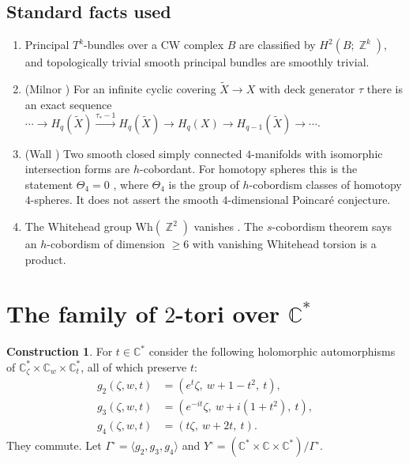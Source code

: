 \documentclass{article}
\DeclareMathOperator{\Z}{\mathbb{Z}}
\theoremstyle{definition}
\newtheorem{construction}[theorem]{Construction}
\theoremstyle{plain}
\newcommand{\C}{\mathbb{C}}
\newcommand{\Yo}{Y^{\circ}}
\begin{document}
\subsection{Standard facts used}\label{sec:facts}
\begin{enumerate}
\item[(F1)] Principal $T^k$-bundles over a CW complex $B$ are classified by
  $H^2(B;\Z^k)$, and topologically trivial smooth principal bundles are smoothly
  trivial.
\item[(F2)] (Milnor \cite{Milnor68}) For an infinite cyclic covering $\widetilde X\to X$
  with deck generator $\tau$ there is an exact sequence
  $\cdots\to H_q(\widetilde X)\xrightarrow{\tau_*-1}H_q(\widetilde X)\to H_q(X)\to
  H_{q-1}(\widetilde X)\to\cdots$.
\item[(F3)] (Wall \cite{Wall64}) Two smooth closed simply connected $4$-manifolds with
  isomorphic intersection forms are $h$-cobordant. For homotopy spheres this is the
  statement $\Theta_4=0$ \cite{KervaireMilnor63}, where $\Theta_4$ is the group of
  $h$-cobordism classes of homotopy $4$-spheres. It does not assert the smooth
  $4$-dimensional Poincar\'e conjecture.
\item[(F4)] The Whitehead group $\mathrm{Wh}(\Z^2)$ vanishes \cite{BHS64}. The
  $s$-cobordism theorem \cite{Kervaire65,Milnor66} says an $h$-cobordism of dimension $\ge6$
  with vanishing Whitehead torsion is a product.
\end{enumerate}

\section{The family of $2$-tori over $\C^*$}\label{sec:family}

\begin{construction}\label{con:family}
For $t\in\C^*$ consider the following holomorphic automorphisms of
$\C^*_\zeta\times\C_w\times\C^*_t$, all of which preserve $t$:
\begin{align*}
g_2(\zeta,w,t)&=(e^{t}\zeta,\ w+1-t^2,\ t),\\
g_3(\zeta,w,t)&=(e^{-it}\zeta,\ w+i(1+t^2),\ t),\\
g_4(\zeta,w,t)&=(t\zeta,\ w+2t,\ t).
\end{align*}
They commute. Let $\Gamma^\circ=\langle g_2,g_3,g_4\rangle$ and $\Yo=(\C^*\times\C\times\C^*)/\Gamma^\circ$.
\end{construction}
\end{document}
